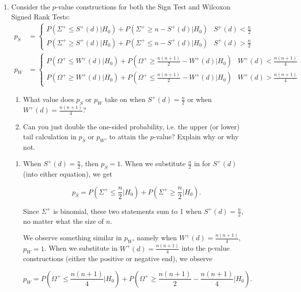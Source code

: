 \documentclass{article}
\begin{document}
\begin{enumerate}
			\newpage
		\item Consider the $p$-value constructions for both the Sign Test and Wilcoxon Signed Rank Tests:
			\begin{align*}
				p_S &= \left\{
					\begin{array}{cc}
						P(\Sigma^+ \leq S^{+}(d) | H_0) + P(\Sigma^+ \geq n - S^{+}(d) | H_0) & S^{+}(d) < \frac{n}{2}\\
						P(\Sigma^+ \geq S^{+}(d) | H_0) + P(\Sigma^+ \leq n - S^{+}(d) | H_0) & S^{+}(d) > \frac{n}{2}
					\end{array}\right.\\
				p_W &= \left\{
					\begin{array}{cc}
						P(\Omega^+ \leq W^{+}(d) | H_0) + P(\Omega^+ \geq \frac{n(n+1)}{2} - W^{+}(d) | H_0) & W^{+}(d) < \frac{n(n+1)}{4}\\
						P(\Omega^+ \geq W^{+}(d) | H_0) + P(\Omega^+ \leq \frac{n(n+1)}{2} - W^{+}(d) | H_0) & W^{+}(d) > \frac{n(n+1)}{4}
					\end{array}\right.
			\end{align*}
		
		\begin{enumerate}
			\item What value does $p_S$ or $p_W$ take on when $S^+(d) = \frac{n}{2}$ or when $W^+(d) = \frac{n(n+1)}{4}$?
			\item Can you just double the one-sided probability, i.e. the upper (or lower) tail calculation in $p_S$ or $p_W$, to attain the $p$-value? Explain why or why not.
		\end{enumerate}

		\begin{enumerate}
			\item When $S^+(d) = \frac{n}{2}$, then $p_S = 1$. When we substitute $\frac{n}{2}$ in for $S^+(d)$ (into either equation), we get
			
			$$p_S = P(\Sigma^+ \leq \frac{n}{2}|H_0) + P(\Sigma^+ \geq \frac{n}{2}|H_0 ) .$$

			Since $\Sigma^+$ is binomial, these two statements sum to 1 when $S^+(d) = \frac{n}{2}$, no matter what the size of $n$.

			We observe something similar in $p_W$, namely when $W^+(d) = \frac{n(n+1)}{4}$, $p_W = 1$. When we substitute in $W^+(d) = \frac{n(n+1)}{4}$ into the p-value constructions (either the positive or negative end), we observe

			$$p_W = P(\Omega^+ \leq \frac{n(n+1)}{4} | H_0) + P(\Omega^+ \geq \frac{n(n+1)}{2} - \frac{n(n+1)}{4} | H_0).$$


\end{enumerate}
\end{enumerate}
\end{document}

